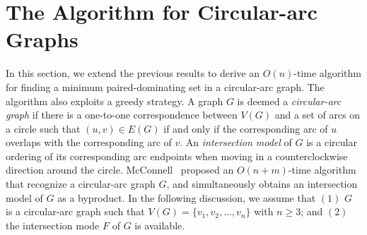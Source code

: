 \documentclass[12pt]{article}
\newcommand{\setof}[1]{\{{#1}\}}
\begin{document}
\section{The Algorithm for Circular-arc Graphs
                              \label{section:algo-cir}}


In this section, we extend the previous results to derive an
$O(n)$-time algorithm for finding a minimum paired-dominating
set in a circular-arc graph. The algorithm also exploits a greedy strategy. A graph $G$ is deemed a {\em circular-arc graph} if there is a one-to-one correspondence between $V(G)$ and a set of arcs on a circle such that $(u, v)\in E(G)$ if and only if the corresponding arc of $u$ overlaps with the corresponding arc of $v$. An {\em intersection model} of $G$ is a circular ordering of its corresponding arc endpoints when moving in a counterclockwise direction around the circle. McConnell~\cite{McConnell03} proposed an $O(n+m)$-time algorithm that recognize a circular-arc graph $G$, and simultaneously obtains an intersection model of $G$ as a byproduct. In the following discussion, we assume that $(1)$ $G$ is a circular-arc graph such that $V(G) = \setof{v_1,v_2,\ldots,v_n}$ with $n \ge 3$; and $(2)$ the intersection mode $F$ of $G$ is available.

\hspace{1pt}
\end{document}
